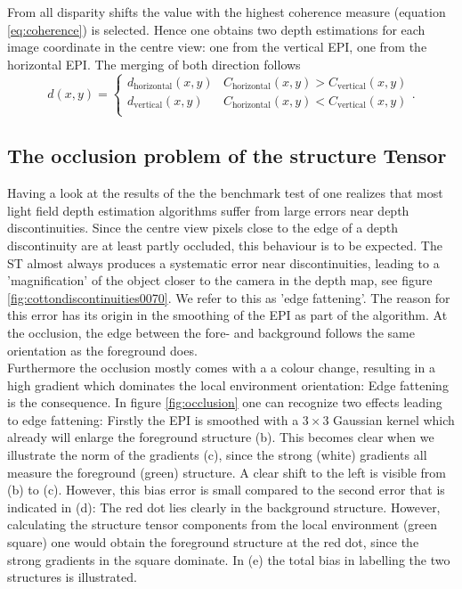 \documentclass  [
  paper    = a4,
  BCOR     = 10mm,
  twoside,
  fontsize = 12pt,
  fleqn,
  toc      = bibnumbered,
  toc      = listofnumbered,
  numbers  = noendperiod,
  headings = normal,
  listof   = leveldown,
  version  = 3.03
]                                       {scrreprt}
\begin{document}
 From all disparity shifts the value with the highest coherence measure (equation \ref{eq:coherence}) is selected. Hence one obtains two depth estimations for each image coordinate in the centre view: one from the vertical EPI, one from the horizontal EPI. The merging of both direction follows
 \begin{equation}\label{key}
 d(x,y) = \begin{cases} d_\text{horizontal}(x,y) & C_\text{horizontal}(x,y)>C_\text{vertical}(x,y)\\
 						d_\text{vertical}(x,y) & C_\text{horizontal}(x,y)<C_\text{vertical}(x,y)\\
 		\end{cases}.
 \end{equation} 
 \subsection{The occlusion problem of the structure Tensor}
 \label{sec:occlusionproblem}
 Having a look at the results of the the benchmark test of \cite{honauer2016benchmark} one realizes that most light field depth estimation algorithms suffer from large errors near depth discontinuities. Since the centre view pixels close to the edge of a depth discontinuity are at least partly occluded, this behaviour is to be expected. The ST almost always produces a systematic error near discontinuities, leading to a 'magnification' of the object closer to the camera in the depth map, see figure \ref{fig:cottondiscontinuities0070}. We refer to this as 'edge fattening'. The reason for this error has its origin in the smoothing of the EPI as part of the algorithm.  At the occlusion, the edge between the fore- and background follows the same orientation as the foreground does. \\
  Furthermore the occlusion mostly comes with a a colour change, resulting in a high gradient which dominates the local environment orientation: Edge fattening is the consequence. In figure \ref{fig:occlusion} one can recognize two effects leading to edge fattening: Firstly the EPI is smoothed with a $3\times 3$ Gaussian kernel which already will enlarge the foreground structure (b). This becomes clear when we illustrate the norm of the gradients (c), since the strong (white) gradients all measure the foreground (green) structure. A clear shift to the left is visible from (b) to (c). However, this bias error is small compared to the second error that is indicated in (d): The red dot lies clearly in the background structure. However, calculating the structure tensor components from the local environment (green square) one would obtain the foreground structure at the red dot, since the strong gradients in the square dominate. In (e) the total bias in labelling the two structures is illustrated. 
\end{document}
